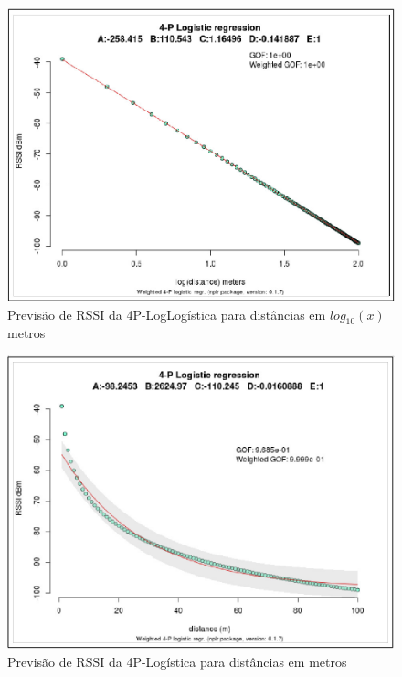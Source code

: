 \documentclass[
	12pt,				%
	twoside,			%
	a4paper,			%
	english,			%
	french,				%
	spanish,			%
	brazil				%
	]{abntex2}
\begin{document}
\begin{figure}[htb]
    \caption{\label{logistic_regression_1} Previsão de RSSI da 4P-LogLogística para distâncias em $ log_{10}(x) $ metros}
    \begin{center}
        \includegraphics[scale=0.47]{imagens/logistic-regression-1.jpg}
    \end{center}
\end{figure}
\begin{figure}[htb]
    \caption{\label{logistic_regression_2} Previsão de RSSI da 4P-Logística para distâncias em metros}
    \begin{center}
        \includegraphics[scale=0.47]{imagens/logistic-regression-2.jpg}
    \end{center}
\end{figure}
\end{document}
